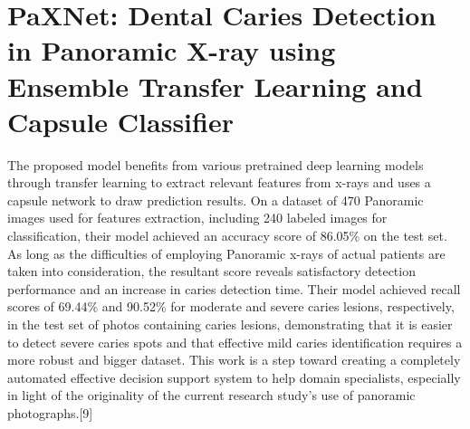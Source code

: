 \section{PaXNet: Dental Caries Detection in Panoramic X-ray using Ensemble Transfer Learning and Capsule Classifier}
The proposed model benefits from various pretrained deep learning models through transfer learning to extract relevant features from x-rays and uses a capsule network to draw prediction results. On a dataset of 470 Panoramic images used for features extraction, including 240 labeled images for classification, their model achieved an accuracy score of 86.05\% on the test set. As long as the difficulties of employing Panoramic x-rays of actual patients are taken into consideration, the resultant score reveals satisfactory detection performance and an increase in caries detection time. Their model achieved recall scores of 69.44\% and 90.52\% for moderate and severe caries lesions, respectively, in the test set of photos containing caries lesions, demonstrating that it is easier to detect severe caries spots and that effective mild caries identification requires a more robust and bigger dataset. This work is a step toward creating a completely automated effective decision support system to help domain specialists, especially in light of the originality of the current research study's use of panoramic photographs.[9]\\
